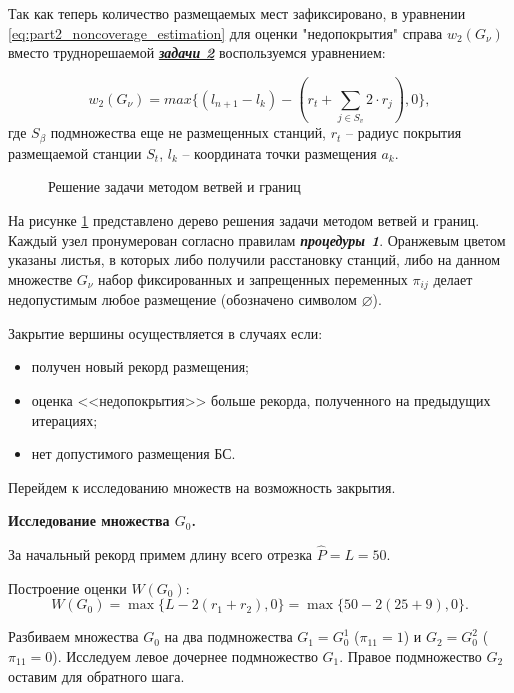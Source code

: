 Так как теперь количество размещаемых мест зафиксировано, в уравнении \cref{eq:part2_noncoverage_estimation} для оценки "недопокрытия" справа $w_2 \left(G_\nu \right)$ вместо труднорешаемой \underline{\textit{\textbf{задачи 2}}} воспользуемся уравнением:

\begin{equation}\label{eq:part4_noncoverage_estimation2}
  w_2 \left(G_\nu \right) = max\{\left(l_{n+1}-l_k\right)-(r_t+\sum_{j\in S_v}{2 \cdot r_j}),0\},
\end{equation}
где $S_\beta$ подмножества еще не размещенных станций, $r_t$ -- радиус покрытия размещаемой станции $S_t$, $l_k$ -- координата точки размещения $a_k$.

\begin{figure}[ht]
  \caption{Решение задачи методом ветвей и границ}\label{fig:part2_branch_and_bound_tree}
\end{figure}


На рисунке \cref{fig:part2_branch_and_bound_tree} представлено дерево решения задачи методом ветвей и границ. Каждый узел пронумерован согласно правилам \textit{\textbf{процедуры 1}}. Оранжевым цветом указаны листья, в которых либо получили расстановку станций, либо на данном множестве $G_\nu$ набор фиксированных и запрещенных переменных $\pi_{ij}$ делает недопустимым любое размещение (обозначено символом $\varnothing$).

Закрытие вершины осуществляется в случаях если:
\begin{itemize}
  \item получен новый рекорд размещения;
  \item оценка <<недопокрытия>> больше рекорда, полученного на предыдущих итерациях;
  \item нет допустимого размещения БС.
\end{itemize} 
Перейдем к исследованию множеств на возможность закрытия.

\textbf{Исследование множества $G_0$.}

За начальный рекорд примем длину всего отрезка $\widehat{P} = L = 50$.

Построение оценки $W(G_0)$:
$$
W(G_0)= \max\{L-2(r_1 + r_2), 0\} = \max\{50 -2(25+9), 0 \}.
$$

Разбиваем множества $G_0$ на два подмножества $G_1 = G^1_0$ ($\pi_{11} = 1$) и $G_2 = G^2_0$ ($\pi_{11} = 0$). Исследуем левое дочернее подмножество $G_1$. Правое подмножество $G_2$ оставим для обратного шага.

